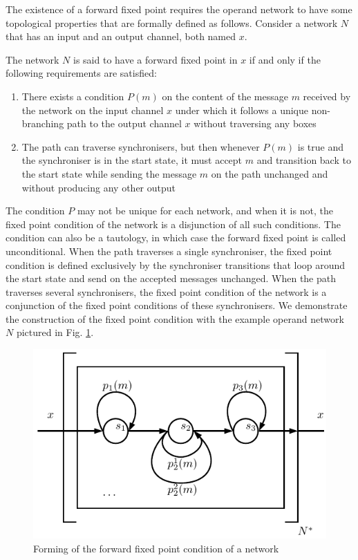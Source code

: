 The existence of a forward fixed point requires the operand network to have some topological properties that are formally defined as follows. Consider a network $N$ that has an input and an output channel, both named $x$.

\begin{definition}The network $N$ is said to have a forward fixed point in $x$ if and only if the following requirements are satisfied:
\begin{enumerate}
\item There exists a condition $P(m)$ on the content of the message $m$ received by the network on the input channel $x$ under which it follows a unique non-branching path to the output channel $x$ without traversing any boxes
\item The path can traverse synchronisers, but then whenever $P(m)$ is true and the synchroniser is in the start state, it must accept $m$ and transition back to the start state while sending the message $m$ on the path unchanged and without producing any other output%
\end{enumerate}
\end{definition}

The condition $P$ may not be unique for each network, and when it is not, the fixed point condition of the network is a disjunction of all such conditions. The condition can also be a tautology, in which case the forward fixed point is called unconditional. When the path traverses a single synchroniser, the fixed point condition is defined exclusively by the synchroniser transitions that loop around the start state and send on the accepted messages unchanged. When the path traverses several synchronisers, the fixed point condition of the network is a conjunction of the fixed point conditions of these synchronisers. We demonstrate the construction of the fixed point condition with the example operand network $N$ pictured in Fig. \ref{fig:ffp}.

\begin{figure}[h!]
\centering
\includegraphics[scale=0.8]{figs/chapter_04_ffp.pdf}
\caption{Forming of the forward fixed point condition of a network}
\label{fig:ffp}
\end{figure}

